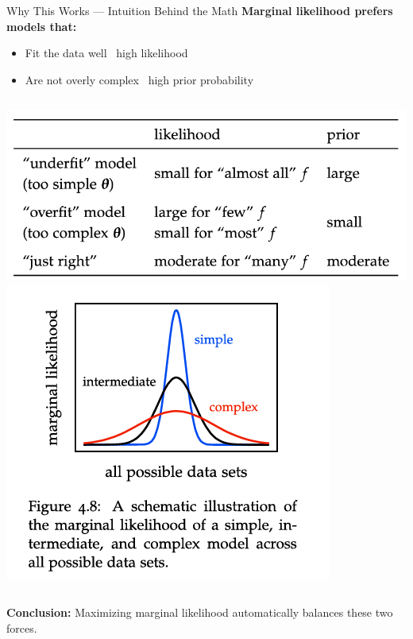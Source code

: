 \documentclass[handout,aspectratio=169]{beamer}
\begin{document}
\begin{frame}{Why This Works — Intuition Behind the Math}
\textbf{Marginal likelihood prefers models that:}
\begin{itemize}
    \item Fit the data well \rightarrow  \, high likelihood
    \item Are not overly complex \rightarrow \, high prior probability
\end{itemize}

\begin{columns}
    \includegraphics[width=\linewidth]{chapter_figs/04_figs/table.png}
    \includegraphics[width=0.8\linewidth]{chapter_figs/04_figs/f48.png}
\end{columns}




\pause
\vspace{0.3cm}
\textbf{Conclusion:} Maximizing marginal likelihood automatically balances these two forces. 
\end{frame}
\end{document}
